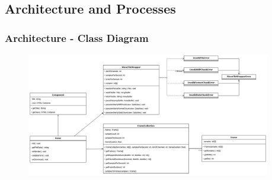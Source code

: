 \subsection{Architecture and Processes}\label{subsec:architecture-and-processes}

\begin{frame}
    \frametitle{Architecture - Class Diagram}
    \begin{figure}
        \centering
        \includegraphics[width=0.95\textwidth]{../assets/class_diagram.png}
    \end{figure}
\end{frame}

